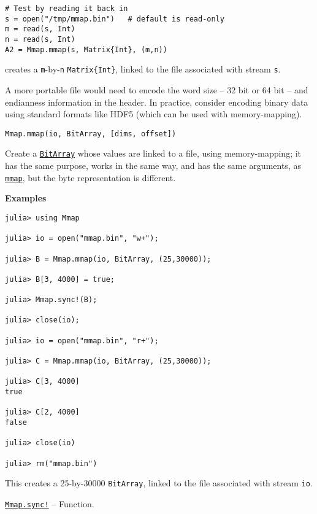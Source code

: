 \begin{adjustwidth}{2em}{0pt}
\begin{verbatim}
# Test by reading it back in
s = open("/tmp/mmap.bin")   # default is read-only
m = read(s, Int)
n = read(s, Int)
A2 = Mmap.mmap(s, Matrix{Int}, (m,n))
\end{verbatim}

creates a \texttt{m}-by-\texttt{n} \texttt{Matrix\{Int\}}, linked to the file associated with stream \texttt{s}.

A more portable file would need to encode the word size – 32 bit or 64 bit – and endianness information in the header. In practice, consider encoding binary data using standard formats like HDF5 (which can be used with memory-mapping).




\begin{lstlisting}
Mmap.mmap(io, BitArray, [dims, offset])
\end{lstlisting}

Create a \hyperlink{18015155802543401629}{\texttt{BitArray}} whose values are linked to a file, using memory-mapping; it has the same purpose, works in the same way, and has the same arguments, as \hyperlink{1028440884226576897}{\texttt{mmap}}, but the byte representation is different.

\textbf{Examples}


\begin{verbatim}
julia> using Mmap

julia> io = open("mmap.bin", "w+");

julia> B = Mmap.mmap(io, BitArray, (25,30000));

julia> B[3, 4000] = true;

julia> Mmap.sync!(B);

julia> close(io);

julia> io = open("mmap.bin", "r+");

julia> C = Mmap.mmap(io, BitArray, (25,30000));

julia> C[3, 4000]
true

julia> C[2, 4000]
false

julia> close(io)

julia> rm("mmap.bin")
\end{verbatim}

This creates a 25-by-30000 \texttt{BitArray}, linked to the file associated with stream \texttt{io}.



\end{adjustwidth}
\hypertarget{10364432000624675045}{}
\hyperlink{10364432000624675045}{\texttt{Mmap.sync!}}  -- {Function.}

